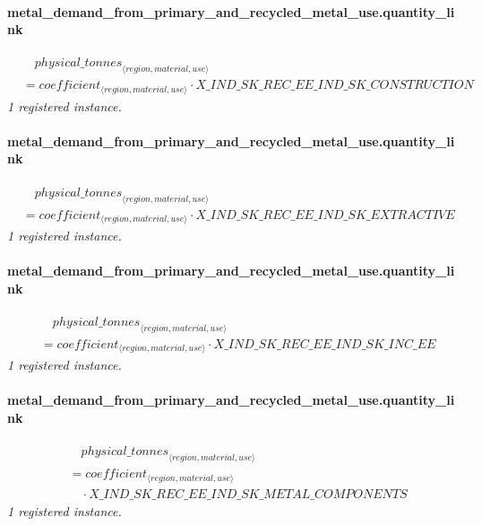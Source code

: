 \documentclass[11pt]{article}
\begin{document}
\paragraph{metal\_demand\_from\_primary\_and\_recycled\_metal\_use.quantity\_link}
\begin{align*}
&\quad {physical\_tonnes}_{\langle region, material, use\rangle}\\
&= coefficient_{\langle region, material, use\rangle} \cdot X\_IND\_SK\_REC\_EE\_IND\_SK\_CONSTRUCTION
\end{align*}
\noindent\emph{1 registered instance.}\par
\paragraph{metal\_demand\_from\_primary\_and\_recycled\_metal\_use.quantity\_link}
\begin{align*}
&\quad {physical\_tonnes}_{\langle region, material, use\rangle}\\
&= coefficient_{\langle region, material, use\rangle} \cdot X\_IND\_SK\_REC\_EE\_IND\_SK\_EXTRACTIVE
\end{align*}
\noindent\emph{1 registered instance.}\par
\paragraph{metal\_demand\_from\_primary\_and\_recycled\_metal\_use.quantity\_link}
\begin{align*}
&\quad {physical\_tonnes}_{\langle region, material, use\rangle}\\
&= coefficient_{\langle region, material, use\rangle} \cdot X\_IND\_SK\_REC\_EE\_IND\_SK\_INC\_EE
\end{align*}
\noindent\emph{1 registered instance.}\par
\paragraph{metal\_demand\_from\_primary\_and\_recycled\_metal\_use.quantity\_link}
\begin{align*}
&\quad {physical\_tonnes}_{\langle region, material, use\rangle}\\
&= coefficient_{\langle region, material, use\rangle}\\
&\quad {}\cdot X\_IND\_SK\_REC\_EE\_IND\_SK\_METAL\_COMPONENTS
\end{align*}
\noindent\emph{1 registered instance.}\par
\end{document}
